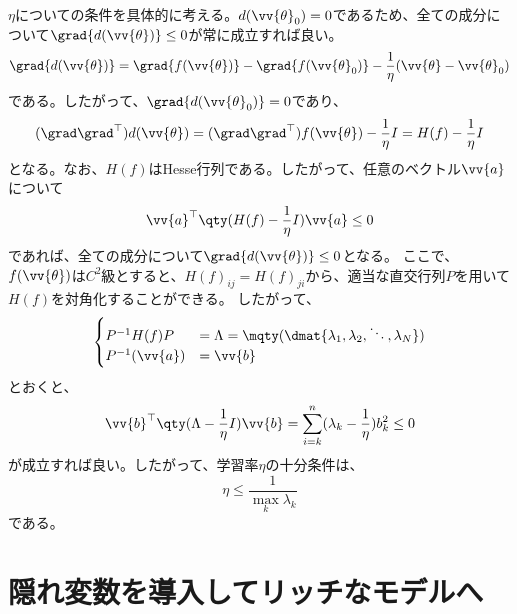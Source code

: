 \documentclass[a4paper,11pt,uplatex]{jsarticle}%
\begin{document}
$\eta$についての条件を具体的に考える。$d(\vv{\theta}_0)=0$であるため、全ての成分について$\grad{d(\vv{\theta})}\leq 0$が常に成立すれば良い。
\begin{equation}
  \grad{d(\vv{\theta})} = \grad{f(\vv{\theta})}-\grad{f(\vv{\theta}_0)}-\frac{1}{\eta}(\vv{\theta}-\vv{\theta}_0)
\end{equation}
である。したがって、$\grad{d(\vv{\theta}_0)}=0$であり、
\begin{equation}
  (\grad\grad^{\top})d(\vv{\theta})=(\grad\grad^{\top})f(\vv{\theta}) - \frac{1}{\eta}I = H(f)-\frac{1}{\eta}I
\end{equation}
となる。なお、$H(f)$はHesse行列である。したがって、任意のベクトル$\vv{a}$について
\begin{equation}
  \vv{a}^{\top}\qty(H(f)-\frac{1}{\eta} I)\vv{a} \leq 0
\end{equation}
であれば、全ての成分について$\grad{d(\vv{\theta})}\leq 0$となる。
ここで、$f(\vv{\theta})$は$C^2$級とすると、$H(f)_{ij}=H(f)_{ji}$から、適当な直交行列$P$を用いて$H(f)$を対角化することができる。
したがって、
\begin{equation}
  \begin{cases}
    P^{-1}H(f)P    & = \Lambda = \mqty(\dmat{\lambda_1,\lambda_2,\ddots,\lambda_N}) \\
    P^{-1}(\vv{a}) & = \vv{b}
  \end{cases}
\end{equation}
とおくと、
\begin{equation}
  \vv{b}^{\top}\qty(\Lambda-\frac{1}{\eta} I)\vv{b} = \sum_{i=k}^n(\lambda_k-\frac{1}{\eta})b_k^2 \leq 0
\end{equation}
が成立すれば良い。したがって、学習率$\eta$の十分条件は、
\begin{equation}
  \eta\leq \frac{1}{\max_{k}{\lambda_k}}
\end{equation}
である。

\section{隠れ変数を導入してリッチなモデルへ}
\end{document}
